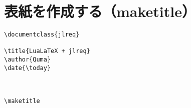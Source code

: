 \section{表紙を作成する（maketitle）}

\begin{verbatim}
\documentclass{jlreq}

\title{LuaLaTeX + jlreq}
\author{Quma}
\date{\today}



\maketitle


\end{verbatim}
